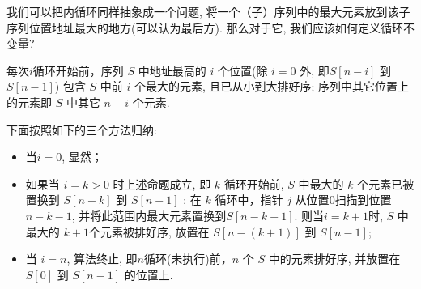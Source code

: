 我们可以把内循环同样抽象成一个问题, 将一个（子）序列中的最大元素放到该子序列位置地址最大的地方(可以认为最后方). 那么对于它, 我们应该如何定义循环不变量? 

每次$i$循环开始前，序列 $S$ 中地址最高的 $i$ 个位置(除 $i=0$ 外, 即$S[n-i]$ 到 $S[n-1]$) 包含 $S$ 中前 $i$ 个最大的元素, 且已从小到大排好序; 序列中其它位置上的元素即 $S$ 中其它 $n-i$ 个元素. 

下面按照如下的三个方法归纳: 

\begin{itemize}
	\item 当$i=0$, 显然；
	\item 如果当 $i=k>0$ 时上述命题成立, 即 $k$ 循环开始前,  $S$ 中最大的 $k$ 个元素已被置换到 $S[n-k]$ 到 $S[n-1]$ ; 在 $k$ 循环中，指针 $j$ 从位置$0$扫描到位置$n-k-1$, 并将此范围内最大元素置换到$S[n-k-1]$. 则当$i=k+1$时, $S$ 中最大的 $k+1$个元素被排好序, 放置在 $S[n-(k+1)]$ 到 $S[n-1]$;
	\item 当 $i=n$, 算法终止, 即$n$循环(未执行)前，$n$ 个 $S$ 中的元素排好序, 并放置在 $S[0]$ 到 $S[n-1]$ 的位置上. 
 

\end{itemize}

